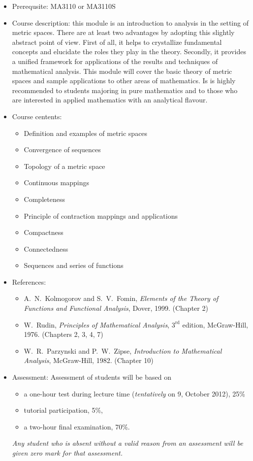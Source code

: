 \documentclass[a4paper]{article}
\begin{document}
\begin{itemize}
\item Prerequsite: MA3110 or MA3110S

\item Course description: this module is an introduction to analysis in the setting of metric spaces. There are at least two advantages by adopting this slightly abstract point of view. First of all, it helps to crystallize fundamental concepts and elucidate the roles they play in the theory. Secondly, it provides a unified framework for applications of the results and techniques of mathematical analysis. This module will cover the basic theory of metric spaces and sample applications to other areas of mathematics. Is is highly recommended to students majoring in pure mathematics and to those who are interested in applied mathematics with an analytical flavour.

\item Course centents: 
  \begin{itemize}
  \item Definition and examples of metric spaces
  \item Convergence of sequences
  \item Topology of a metric space
  \item Continuous mappings
  \item Completeness
  \item Principle of contraction mappings and applications
  \item Compactness
  \item Connectedness
  \item Sequences and series of functions
  \end{itemize}
\item References:
  \begin{itemize}
  \item A.~N.~Kolmogorov and S.~V.~Fomin, \emph{Elements of the Theory of Functions and Functional Analysis}, Dover, 1999. (Chapter 2)
  \item W.~Rudin, \emph{Principles of Mathematical Analysis}, $3^{\mathrm{rd}}$ edition, McGraw-Hill, 1976. (Chapters 2, 3, 4, 7)
  \item W.~R.~Parzynski and P.~W.~Zipse, \emph{Introduction to Mathematical Analysis}, McGraw-Hill, 1982. (Chapter 10)
  \end{itemize}
\item Assessment:
  Assessment of students will be based on
  \begin{itemize}
  \item a one-hour test during lecture time (\emph{tentatively} on 9, October 2012), 25\%
  \item tutorial participation, 5\%,
  \item a two-hour final examination, 70\%.
  \end{itemize}
  \emph{Any student who is absent without a valid reason from an assessment will be given zero mark for that assessment.}
\end{itemize}
\end{document}
